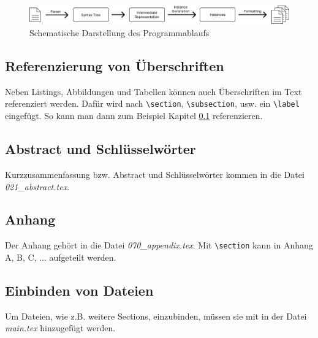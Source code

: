 \begin{figure}
    \includegraphics[width=\textwidth]{image/generator.png}
    \caption{Schematische Darstellung des Programmablaufs}
    \label{fig:prog-schematic}
\end{figure}


\subsection{Referenzierung von Überschriften}
\label{ref-headlines}

Neben Listings, Abbildungen und Tabellen können auch Überschriften im Text referenziert werden. Dafür wird nach \lstinline|\section|, \lstinline|\subsection|, usw. ein \lstinline|\label| eingefügt. So kann man dann zum Beispiel Kapitel \ref{ref-headlines} referenzieren.


\subsection{Abstract und Schlüsselwörter}

Kurzzusammenfassung bzw. Abstract und Schlüsselwörter kommen in die Datei \textit{021\_abstract.tex}.

\subsection{Anhang}

Der Anhang gehört in die Datei \textit{070\_appendix.tex}. Mit \lstinline|\section| kann in Anhang A, B, C, ... aufgeteilt werden.

\subsection{Einbinden von Dateien}

Um Dateien, wie z.B. weitere Sections, einzubinden, müssen sie mit \lstinline|| in der Datei \textit{main.tex} hinzugefügt werden.